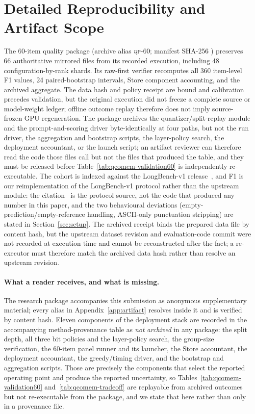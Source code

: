 \documentclass{article}
\begin{document}
\section{Detailed Reproducibility and Artifact Scope}
\label{app:reproducibility}

The 60-item quality package (archive alias \textsc{qp-60}; manifest SHA-256
)
preserves 66 authoritative mirrored files from its recorded execution,
including 48 configuration-by-rank shards.  Its
raw-first verifier recomputes all 360 item-level F1 values, 24 paired-bootstrap
intervals, Store component accounting, and the archived aggregate.  The data
hash and policy receipt are bound and calibration precedes validation, but the
original execution did not freeze a complete source or model-weight ledger;
offline outcome replay therefore does not imply source-frozen GPU
regeneration.  The package archives the quantizer/split-replay module and the
prompt-and-scoring driver byte-identically at four paths, but not the run
driver, the aggregation and bootstrap scripts, the layer-policy search, the
deployment accountant, or the launch script; an artifact reviewer can therefore
read the code those files call but not the files that produced the table, and
they must be released before Table~\ref{tab:qcomem-validation60} is
independently re-executable.  The cohort is indexed against the LongBench-v1
release~\citep{bai2024longbenchrelease}, and F1 is our reimplementation of the
LongBench-v1  protocol rather than the upstream module: the
citation~\citep{bai2024longbenchcode} is the protocol source, not the code that
produced any number in this paper, and the two behavioural deviations
(empty-prediction/empty-reference handling, ASCII-only punctuation stripping)
are stated in Section~\ref{sec:setup}.  The
archived receipt binds the prepared data file by content hash, but the upstream
dataset revision and evaluation-code commit were not recorded at execution time
and cannot be reconstructed after the fact; a re-executor must therefore match
the archived data hash rather than resolve an upstream revision.

\paragraph{What a reader receives, and what is missing.}
The research package accompanies this submission as anonymous supplementary
material; every alias in Appendix~\ref{app:artifact} resolves inside it and is
verified by content hash.  Eleven components of the deployment stack are
recorded in the accompanying method-provenance table as \emph{not archived} in
any package: the split depth, all three bit policies and the layer-policy
search, the group-size verification, the 60-item panel runner and its launcher,
the Store accountant, the deployment accountant, the greedy/timing driver, and
the bootstrap and aggregation scripts.  Those are precisely the components that
select the reported operating point and produce the reported uncertainty, so
Tables~\ref{tab:qcomem-validation60} and~\ref{tab:qcomem-tradeoff} are
replayable from archived outcomes but not re-executable from the package, and we
state that here rather than only in a provenance file.
\end{document}
